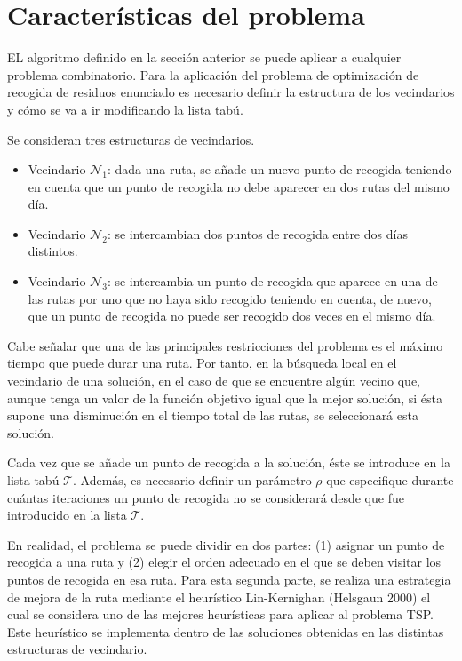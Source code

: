 \documentclass[
]{article}
\begin{document}
\hypertarget{caracteruxedsticas-del-problema}{%
\section{Características del
problema}\label{caracteruxedsticas-del-problema}}

EL algoritmo definido en la sección anterior se puede aplicar a
cualquier problema combinatorio. Para la aplicación del problema de
optimización de recogida de residuos enunciado es necesario definir la
estructura de los vecindarios y cómo se va a ir modificando la lista
tabú.

Se consideran tres estructuras de vecindarios.

\begin{itemize}
\item
  Vecindario \(\mathcal{N}_1\): dada una ruta, se añade un nuevo punto
  de recogida teniendo en cuenta que un punto de recogida no debe
  aparecer en dos rutas del mismo día.
\item
  Vecindario \(\mathcal{N}_2\): se intercambian dos puntos de recogida
  entre dos días distintos.
\item
  Vecindario \(\mathcal{N}_3\): se intercambia un punto de recogida que
  aparece en una de las rutas por uno que no haya sido recogido teniendo
  en cuenta, de nuevo, que un punto de recogida no puede ser recogido
  dos veces en el mismo día.
\end{itemize}

Cabe señalar que una de las principales restricciones del problema es el
máximo tiempo que puede durar una ruta. Por tanto, en la búsqueda local
en el vecindario de una solución, en el caso de que se encuentre algún
vecino que, aunque tenga un valor de la función objetivo igual que la
mejor solución, si ésta supone una disminución en el tiempo total de las
rutas, se seleccionará esta solución.

Cada vez que se añade un punto de recogida a la solución, éste se
introduce en la lista tabú \(\mathcal{T}\). Además, es necesario definir
un parámetro \(\rho\) que especifique durante cuántas iteraciones un
punto de recogida no se considerará desde que fue introducido en la
lista \(\mathcal{T}\).

En realidad, el problema se puede dividir en dos partes: (1) asignar un
punto de recogida a una ruta y (2) elegir el orden adecuado en el que se
deben visitar los puntos de recogida en esa ruta. Para esta segunda
parte, se realiza una estrategia de mejora de la ruta mediante el
heurístico Lin-Kernighan (Helsgaun 2000) el cual se considera uno de las
mejores heurísticas para aplicar al problema TSP. Este heurístico se
implementa dentro de las soluciones obtenidas en las distintas
estructuras de vecindario.
\end{document}
